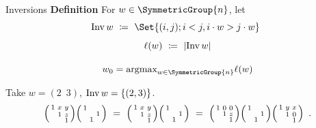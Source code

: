 \documentclass[9pt]{beamer}
\renewenvironment{definition}[1][]
{\textcolor{LineColor}{\textbf{Definition #1}} }
{}
\begin{document}

\begin{frame}[fragile]{Inversions}
  \begin{definition}
    For $w \in \SymmetricGroup{n}$, let
    \[
      \inv w \ \coloneqq \ \Set{(i,j); i < j, i \cdot w > j \cdot w} \enspace 
    \]
    \[
      \ell(w) \ \coloneqq \ \lvert\operatorname{Inv} w\rvert
    \]

    \[
      w_0 = \text{argmax}_{w \in \SymmetricGroup{n}} \ell(w)
    \]
  \end{definition}

  \begin{example}
    Take $w = (2 \enspace 3)$, $\operatorname{Inv} w = \{ (2, 3)\}$.
    \[
      \begin{psmallmatrix}
	1 & x & y \\
          & 1 & z \\
          &   & 1
      \end{psmallmatrix}
      \begin{psmallmatrix}
	1 &   &   \\
          &   & 1 \\
          & 1 &
      \end{psmallmatrix}
      \ = \
      \begin{psmallmatrix}
	1 & x & y \\
          & 1 & z \\
          &   & 1
      \end{psmallmatrix}
      \begin{psmallmatrix}
	1 &   &   \\
          &   & 1 \\
          & 1 &
      \end{psmallmatrix} 
      \ = \
      \begin{psmallmatrix}
	1 & 0 & 0 \\
          & 1 & z \\
          &   & 1
      \end{psmallmatrix} 
      \begin{psmallmatrix}
	1 &   &   \\
          &   & 1 \\
          & 1 &
      \end{psmallmatrix}
      \begin{psmallmatrix}
	1 & y & x \\
          & 1 & 0 \\
          &   & 1
      \end{psmallmatrix} \enspace.
    \]
  \end{example}
\end{frame}
\end{document}
